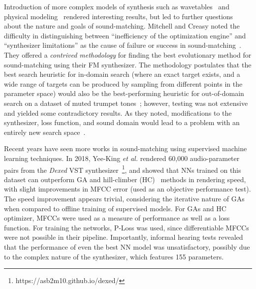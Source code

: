 \documentclass[lettersize,journal]{IEEEtran}
\providecommand{\gls}[1]{#1}
\begin{document}
Introduction of more complex models of synthesis such as wavetables~\cite{horner2003auto} and physical modeling~\cite{riionheimo2003parameter} rendered interesting results, but led to further questions about the nature and goals of sound-matching. Mitchell and Creasy noted the difficulty in distinguishing between ``inefficiency of the optimization engine'' and ``synthesizer limitations'' as the cause of failure or success in sound-matching~\cite{mitchell2007evolutionary}. They offered a \textit{contrived methodology} for finding the best evolutionary method for sound-matching using their FM synthesizer. The methodology postulates that the best search heuristic for in-domain search (where an exact target exists, and a wide range of targets can be produced by sampling from different points in the parameter space) would also be the best-performing heuristic for out-of-domain search on a dataset of muted trumpet tones~\cite{opolko1989mcgill}; however, testing was not extensive and yielded some contradictory results. As they noted, modifications to the synthesizer, loss function, and sound domain would lead to a problem with an entirely new search space~\cite{mitchell2007evolutionary}. 

Recent years have seen more works in sound-matching using supervised machine learning techniques. In 2018, Yee-King \textit{et al.} rendered 60,000 audio-parameter pairs from the \textit{Dexed} \gls{VST} synthesizer~\footnote{https://asb2m10.github.io/dexed/}, and showed that NNs trained on this dataset can outperform GA and hill-climber (\gls{HC})~\cite{hoffmann2000heuristic} methods in rendering speed, with slight improvements in MFCC error (used as an objective performance test). The speed improvement appears trivial, considering the iterative nature of GAs when compared to offline training of supervised models. For GAs and HC optimizer, MFCCs were used as a measure of performance as well as a loss function. For training the networks, P-Loss was used, since differentiable MFCCs were not possible in their pipeline. Importantly, informal hearing tests revealed that the performance of even the best NN model was unsatisfactory, possibly due to the complex nature of the synthesizer, which features 155 parameters.
\end{document}
